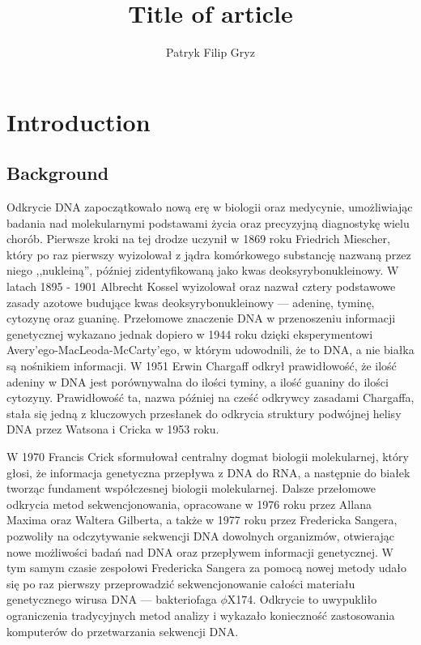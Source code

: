 \documentclass{article}
\newcommand{\temporary}[1]{
    \begin{tcolorbox}[colframe=red, colback=white, title={\textbf{WERSJA PO POLSKU}}, sharp corners=south]
        #1
    \end{tcolorbox}
}
\begin{document}
    \title{Title of article}
    \author{Patryk Filip Gryz}

    \maketitle

    \section{Introduction}

        \subsection{Background}

            \temporary{
                Odkrycie DNA zapoczątkowało nową erę w biologii oraz medycynie, umożliwiając badania nad molekularnymi podstawami życia oraz precyzyjną diagnostykę wielu chorób\cite{Louie:2000}. Pierwsze kroki na tej drodze uczynił w 1869 roku Friedrich Miescher, który po raz pierwszy wyizolował z jądra komórkowego substancję nazwaną przez niego ,,nukleiną''\cite{Dahm:2005}, później zidentyfikowaną jako kwas deoksyrybonukleinowy. W latach 1895 - 1901 Albrecht Kossel wyizolował oraz nazwał cztery podstawowe zasady azotowe budujące kwas deoksyrybonukleinowy — adeninę, tyminę, cytozynę oraz guaninę\cite{Kossel:1893}. Przełomowe znaczenie DNA w przenoszeniu informacji genetycznej wykazano jednak dopiero w 1944 roku dzięki eksperymentowi Avery'ego-MacLeoda-McCarty'ego\cite{Avery:1944}, w którym udowodnili, że to DNA, a nie białka są nośnikiem informacji. W 1951 Erwin Chargaff odkrył prawidłowość, że ilość adeniny w DNA jest porównywalna do ilości tyminy, a ilość guaniny do ilości cytozyny\cite{Chargaff:1952}. Prawidłowość ta, nazwa później na cześć odkrywcy zasadami Chargaffa, stała się jedną z kluczowych przesłanek do odkrycia struktury podwójnej helisy DNA przez Watsona i Cricka w 1953 roku\cite{Watson:1953}.

    W 1970 Francis Crick sformułował centralny dogmat biologii molekularnej\cite{Crick:1970}, który głosi, że informacja genetyczna przepływa z DNA do RNA, a następnie do białek tworząc fundament współczesnej biologii molekularnej. Dalsze przełomowe odkrycia metod sekwencjonowania, opracowane w 1976 roku przez Allana Maxima oraz Waltera Gilberta\cite{Maxam:1977}, a także w 1977 roku przez Fredericka Sangera\cite{Sanger:1977}, pozwoliły na odczytywanie sekwencji DNA dowolnych organizmów, otwierając nowe możliwości badań nad DNA oraz przepływem informacji genetycznej. W tym samym czasie zespołowi Fredericka Sangera za pomocą nowej metody udało się po raz pierwszy przeprowadzić sekwencjonowanie całości materiału genetycznego  wirusa DNA — bakteriofaga $\phi{}$X174\cite{Sanger:1977:2}. Odkrycie to uwypukliło ograniczenia tradycyjnych metod analizy i wykazało konieczność zastosowania komputerów do przetwarzania sekwencji DNA\cite{Staden:1979}.

}
\end{document}

